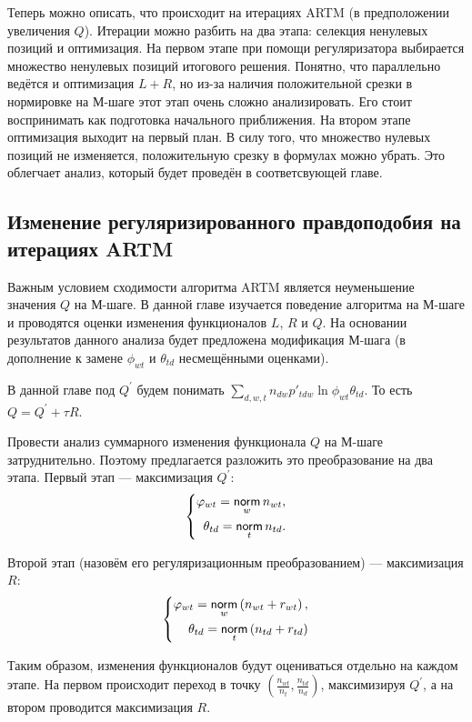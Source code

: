 \documentclass[12pt, twoside]{article}
\begin{document}
Теперь можно описать, что происходит на итерациях ARTM (в предположении увеличения $Q$). Итерации можно разбить на два этапа: селекция ненулевых позиций и оптимизация. На первом этапе при помощи регуляризатора выбирается множество ненулевых позиций итогового решения. Понятно, что параллельно ведётся и оптимизация $L + R$, но из-за наличия положительной срезки в нормировке на М-шаге этот этап очень сложно анализировать. Его стоит воспринимать как подготовка начального приближения. На втором этапе оптимизация выходит на первый план. В силу того, что множество нулевых позиций не изменяется, положительную срезку в формулах можно убрать. Это облегчает анализ, который будет проведён в соответсвующей главе.

	\subsection{Изменение регуляризированного правдоподобия на итерациях ARTM}
Важным условием сходимости алгоритма ARTM является неуменьшение значения $Q$ на М-шаге. В данной главе изучается поведение алгоритма на М-шаге и проводятся оценки изменения функционалов $L$, $R$ и $Q$. На основании результатов данного анализа будет предложена  модификация М-шага (в дополнение к замене $\phi_{wt}$ и $\theta_{td}$ несмещёнными оценками).

В данной главе под $Q^{\prime}$ будем понимать $\sum\limits_{d, w, t} n_{dw} p'_{tdw} \ln{\phi_{wt}\theta_{td}}$. То есть $Q = Q^{\prime} + \tau R$.

Провести анализ суммарного изменения функционала $Q$ на М-шаге затруднительно. Поэтому предлагается разложить это преобразование на два этапа. Первый этап --- максимизация $Q^{\prime}$:
\[
\left\{
	\begin{aligned}
		\varphi_{wt} = \mathop{\mathsf{norm}}\limits_w  n_{wt},\\
		\theta_{td} = \mathop{\mathsf{norm}}\limits_t n_{td} .
	\end{aligned}
\right.
\]

Второй этап (назовём его регуляризационным преобразованием) --- максимизация $R$:
\[
\left\{
\begin{aligned}
 \varphi_{wt}  = \mathop{\mathsf{norm}}\limits_w \left(n_{wt} + r_{wt} \right),\\
\theta_{td} = \mathop{\mathsf{norm}}\limits_t  \left(n_{td} + r_{td}\right)
\end{aligned}
\right.
\]

Таким образом, изменения функционалов будут оцениваться  отдельно на каждом этапе. На первом происходит переход в точку $\left(\frac{n_{wt}}{n_t}, \frac{n_{td}}{n_d}\right)$, максимизируя $Q^{\prime}$, а на втором проводится максимизация $R$. 
\end{document}
